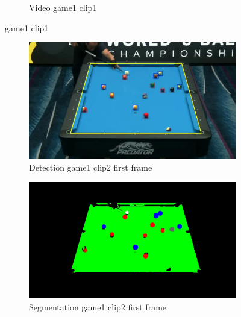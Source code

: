 \begin{figure}[H]
\begin{subfigure}[b]{0.48\textwidth}
    	\caption{Video game1 clip1}
    	\label{fig: game1_clip1_video}
    \end{subfigure}

	\caption{game1 clip1}
\end{figure}

\begin{figure}[H]
    \centering
    \begin{subfigure}[b]{0.48\textwidth}
        \centering
        \includegraphics[width=\textwidth]{images/Detection/game1_clip2_detected_balls_first_frame.jpg}
        \caption{Detection game1 clip2 first frame}
        \label{fig: game1_clip2_first_frame_detected}
    \end{subfigure}
    \begin{subfigure}[b]{0.48\textwidth}
        \centering
        \includegraphics[width=\textwidth]{images/Segmentation/game1_clip2_segmented_balls_first_frame.jpg}
        \caption{Segmentation game1 clip2 first frame}
		\label{fig: game1_clip2_first_frame_segmented}
    \end{subfigure}
    \begin{subfigure}[b]{0.48\textwidth}

\end{subfigure}
\end{figure}
